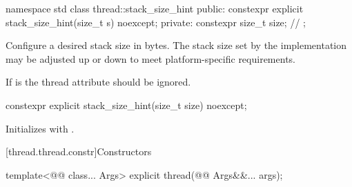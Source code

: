 \documentclass{wg21}
\begin{document}
\begin{addedblock}
\begin{codeblock}
namespace std {
class thread::stack_size_hint {
public:
    constexpr explicit stack_size_hint(size_t s) noexcept;
private:
    constexpr size_t size; // \expos
};
}
\end{codeblock}




Configure a desired stack size in bytes. %
The stack size set by the implementation may be adjusted up or down to meet platform-specific requirements.

If  is  the thread attribute should be ignored.

\begin{itemdecl}
constexpr explicit stack_size_hint(size_t size) noexcept;
\end{itemdecl}

\begin{itemdescr}
\effects Initializes  with .
\end{itemdescr}

\end{addedblock}


[thread.thread.constr]{Constructors}

\begin{itemdecl}
template<@@ class... Args>
explicit thread(@@ Args&&... args);
\end{itemdecl}
\end{document}
